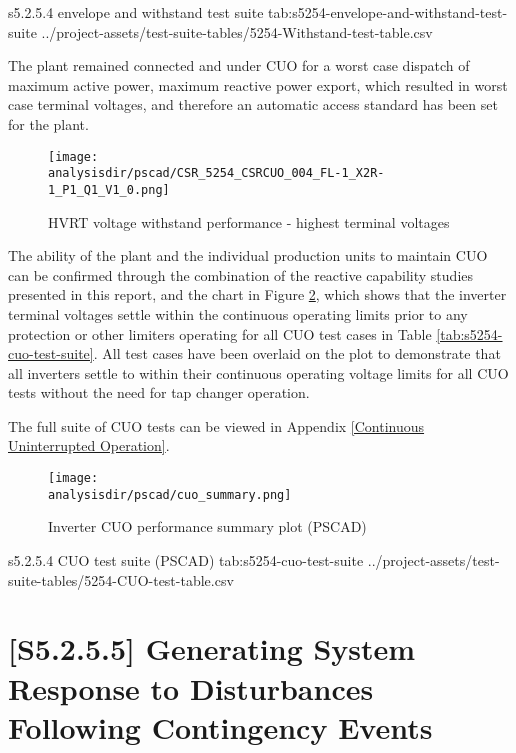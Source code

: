 \documentclass{../grid-link-report}
\newcommand{\projectassetsdir}{../project-assets}
\newcommand{\analysisdir}{report-assets/analysis}
\begin{document}
			\autoscaledlongtable
				{s5.2.5.4 envelope and withstand test suite}
				{tab:s5254-envelope-and-withstand-test-suite}
				{\projectassetsdir/test-suite-tables/5254-Withstand-test-table.csv}
				
			The plant remained connected and under \ac{CUO} for a worst case dispatch of maximum active power, maximum reactive power export, which resulted in worst case terminal voltages, and therefore an automatic access standard has been set for the plant.
			
			\begin{figure}[H]
				\centering
				\texttt{[image: \\analysisdir/pscad/CSR\_5254\_CSRCUO\_004\_FL-1\_X2R-1\_P1\_Q1\_V1\_0.png]}
				\caption{HVRT voltage withstand performance - highest terminal voltages}
				\label{fig:s5253-HVRT-AAS}
			\end{figure}
			
			
				
			The ability of the plant and the individual production units to maintain \ac{CUO} can be confirmed through the combination of the reactive capability studies presented in this report, and the chart in Figure \ref{fig:s5254-cuo-summary-pscad}, which shows that the inverter terminal voltages settle within the continuous operating limits prior to any protection or other limiters operating for all \ac{CUO} test cases in Table \ref{tab:s5254-cuo-test-suite}. All test cases have been overlaid on the plot to demonstrate that all inverters settle to within their continuous operating voltage limits for all \ac{CUO} tests without the need for tap changer operation.
			
			The full suite of CUO tests can be viewed in Appendix \ref{Continuous Uninterrupted Operation}.
			
			\begin{figure}[H]
				\centering
				\texttt{[image: \\analysisdir/pscad/cuo\_summary.png]}
				\caption{Inverter CUO performance summary plot (PSCAD)}
				\label{fig:s5254-cuo-summary-pscad}
			\end{figure}
	
			\autoscaledlongtable
				{s5.2.5.4 CUO test suite (PSCAD)}
				{tab:s5254-cuo-test-suite}
				{\projectassetsdir/test-suite-tables/5254-CUO-test-table.csv}
	
	
	\section{[S5.2.5.5] Generating System Response to Disturbances Following Contingency Events}
\end{document}
